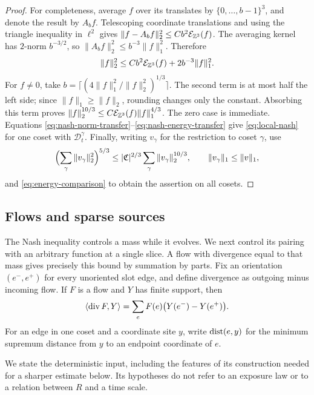 \begin{proof}
For completeness, average \(f\) over its translates by
\(\{0,\ldots,b-1\}^3\), and denote the result by \(A_bf\).
Telescoping coordinate translations and using the triangle inequality
in \(\ell^2\) gives
\(\|f-A_bf\|_2^2\le Cb^2\mathcal E_{\mathbb Z^3}(f)\).
The averaging kernel has \(2\)-norm \(b^{-3/2}\), so
\(\|A_bf\|_2^2\le b^{-3}\|f\|_1^2\).  Therefore
\[
 \|f\|_2^2\le Cb^2\mathcal E_{\mathbb Z^3}(f)+2b^{-3}\|f\|_1^2.
\]
For \(f\ne0\), take
\(b=\lceil(4\|f\|_1^2/\|f\|_2^2)^{1/3}\rceil\).
The second term is at most half the left side; since
\(\|f\|_1\ge\|f\|_2\), rounding changes only the constant.
Absorbing this term proves
\(\|f\|_2^{10/3}\le C\mathcal E_{\mathbb Z^3}(f)\|f\|_1^{4/3}\).
The zero case is immediate.  Equations
\eqref{eq:nash-norm-transfer}--\eqref{eq:nash-energy-transfer} give
\eqref{eq:local-nash} for one coset with \(\mathcal D_t^\gamma\).
Finally, writing \(v_\gamma\) for the restriction to coset \(\gamma\), use
\[
 \Bigl(\sum_\gamma\|v_\gamma\|_2^2\Bigr)^{5/3}
 \le |\mathfrak C|^{2/3}\sum_\gamma\|v_\gamma\|_2^{10/3},
 \qquad \|v_\gamma\|_1\le\|v\|_1,
\]
and \eqref{eq:energy-comparison} to obtain the assertion on all cosets.
\end{proof}

\subsection{Flows and sparse sources}

The Nash inequality controls a mass while it evolves.  We next control
its pairing with an arbitrary function at a single slice.  A flow with
divergence equal to that mass gives precisely this bound by summation
by parts.  Fix an orientation \((e^-,e^+)\) for every unoriented slot
edge, and define divergence as outgoing minus incoming flow.  If \(F\)
is a flow and \(Y\) has finite support, then
\begin{equation}\label{eq:flow-pairing}
 \langle\operatorname{div} F,Y\rangle
 =\sum_eF(e)\bigl(Y(e^-)-Y(e^+)\bigr).
\end{equation}
For an edge in one coset and a coordinate site \(y\), write
\(\operatorname{dist}(e,y)\) for the minimum supremum distance from \(y\) to an
endpoint coordinate of \(e\).

We state the deterministic input, including the features of its
construction needed for a sharper estimate below.  Its hypotheses do
not refer to an exposure law or to a relation between \(R\) and a time
scale.

